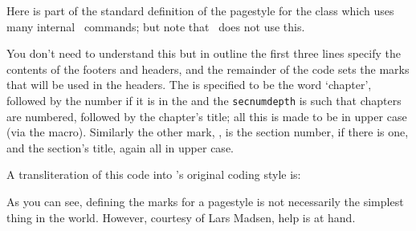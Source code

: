 \begin{plainlist}
    Here is part of the standard definition of the 
pagestyle for the  class which uses many internal \ltx\ commands;
but note that \Mname\ does not use this.
\begin{lcode}
\def\ps@headings{%
  \let\@oddfoot\@empty\let\@evenfoot\@empty
  \def\@evenhead{\thepage\hfil\slshape\leftmark}%
  \def\@oddhead{{\slshape\rightmark}\hfil\thepage}%
  \def\chaptermark##1{%
    \markboth{\MakeUppercase{%
      \ifnum\c@secnumdepth > \m@ne
        \if@mainmatter
          \@chapapp\ \thechapter. \ %
        \fi
      \fi
      ##1}}{}}%
  \def\sectionmark##1{%
    \markright{\MakeUppercase{%
      \ifnum\c@secnumdepth > \z@
        \thesection. \ %
      \fi
      ##1}}}}
\end{lcode}
You don't need to understand this but in outline the first three lines specify
the contents of the footers and headers, and the remainder of the code sets 
the marks that will be used in the headers. The \cmd{\leftmark} is specified to be
the word `chapter', 
followed by the number if it is in the \cmd{\mainmatter} and the \texttt{secnumdepth}
is such that chapters are numbered, followed by the chapter's title; all this 
is made to be in upper case (via the \cmd{\MakeUppercase} macro). Similarly
the other mark, \cmd{\rightmark}, is the section number, if there is one, and
the section's title, again all in upper case.

    A transliteration of this code into \Mname's original coding style is:
\begin{lcode}
\end{lcode}
As you can see, defining the marks for a pagestyle is not necessarily the
simplest thing in the world. However, courtesy of Lars Madsen,
help is at hand.


\end{plainlist}
